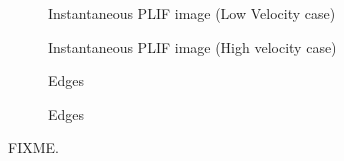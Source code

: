 \begin{figure}

\centering

\hfill
\begin{subfigure}{0.45\linewidth}
  \centering
  
  \caption{Instantaneous PLIF image (Low Velocity case)}
  \label{fig:leanFlameAverageImage}
\end{subfigure}
\hfill
\begin{subfigure}{0.45\linewidth}
  \centering
  
  \caption{Instantaneous PLIF image (High velocity case)}
  \label{fig:richFlameAverageImage}
\end{subfigure}
\hfill

\hfill
\begin{subfigure}{0.45\linewidth}
  \centering
  
  \caption{Edges}
  \label{fig:leanFlameAbelImage}
\end{subfigure}
\hfill
\begin{subfigure}{0.45\linewidth}
  \centering
  
  \caption{Edges}
  \label{fig:richFlameAbelImage}
\end{subfigure}
\hfill

\caption[Effect of Equivalence Ratio]{FIXME.}

\label{fig:equivalenceRatioResults}

\end{figure}

